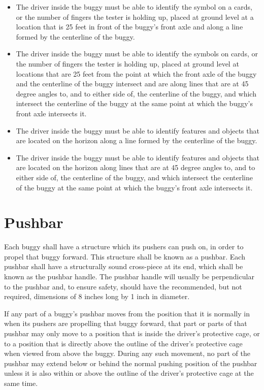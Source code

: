 	\begin{itemize}

		\item
		The driver inside the buggy must be able to identify the symbol on a cards, or
		the number of fingers the tester is holding up, placed at ground level at a
		location that is 25 feet in front of the buggy's front axle and along a line
		formed by the centerline of the buggy.

		\item
		The driver inside the buggy must be able to identify the symbols on cards, or
		the number of fingers the tester is holding up, placed at ground level at
		locations that are 25 feet from the point at which the front axle of the buggy
		and the centerline of the buggy intersect and are along lines that are at 45
		degree angles to, and to either side of, the centerline of the buggy, and which
		intersect the centerline of the buggy at the same point at which the buggy's
		front axle intersects it.

		\item
		The driver inside the buggy must be able to identify features and objects that
		are located on the horizon along a line formed by the centerline of the buggy.

		\item
		The driver inside the buggy must be able to identify features and objects that
		are located on the horizon along lines that are at 45 degree angles to, and to
		either side of, the centerline of the buggy, and which intersect the centerline
		of the buggy at the same point at which the buggy's front axle intersects it.

	\end{itemize}

\section{Pushbar}

	Each buggy shall have a structure which its pushers can push on, in order to
	propel that buggy forward. This structure shall be known as a pushbar. Each
	pushbar shall have a structurally sound cross-piece at its end, which shall be
	known as the pushbar handle. The pushbar handle will usually be perpendicular
	to the pushbar and, to ensure safety, should have the recommended, but not
	required, dimensions of 8 inches long by 1 inch in diameter.

	If any part of a buggy's pushbar moves from the position that it is normally in
	when its pushers are propelling that buggy forward, that part or parts of that
	pushbar may only move to a position that is inside the driver's protective
	cage, or to a position that is directly above the outline of the driver's
	protective cage when viewed from above the buggy. During any such movement, no
	part of the pushbar may extend below or behind the normal pushing position of
	the pushbar unless it is also within or above the outline of the driver's
	protective cage at the same time.

